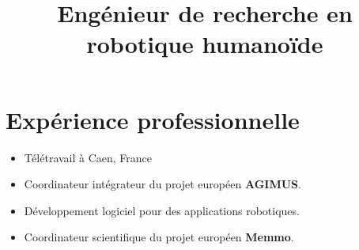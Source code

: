 \documentclass[11pt,a4paper]{moderncv}        %
\title{Eng\'enieur de recherche en robotique humano\"ide}            %
\newcommand{\items}{\item[*] \hspace{2mm}}
\begin{document}
\maketitle

\section{Exp\'erience professionnelle}

{
  \begin{itemize}%
    \items Télétravail à Caen, France
    \items Coordinateur intégrateur du projet européen \textbf{AGIMUS}.
    \items Développement logiciel pour des applications robotiques.
  \end{itemize}
}

{
  \begin{itemize}%
    \items Coordinateur scientifique du projet européen \textbf{Memmo}.
  \end{itemize}
}
\end{document}
